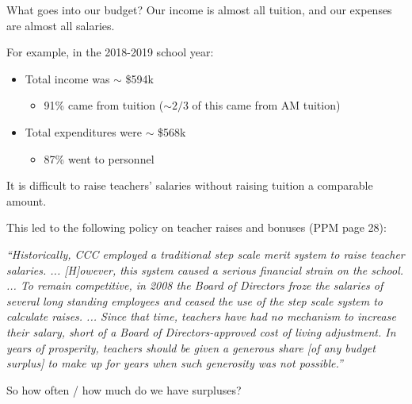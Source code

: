 \documentclass[8pt]{beamer}
\begin{document}
\begin{frame}{What goes into our budget?}
%
Our income is almost all tuition, and our expenses are almost all salaries.

For example, in the 2018-2019 school year:
%
\begin{itemize}
%
\item Total income was $\sim$ \$594k
\begin{itemize}
    \item 91\% came from tuition ($\sim 2/3$ of this came from AM tuition)
\end{itemize}
%
\item Total expenditures were $\sim$ \$568k
\begin{itemize}
    \item 87\% went to personnel
\end{itemize}
%
\end{itemize}
%

It is difficult to raise teachers' salaries without
raising tuition a comparable amount.

This led to the following policy on teacher raises and bonuses (PPM page 28):

{\em
%
``Historically, CCC employed a traditional step scale merit system to raise
teacher salaries. ... [H]owever, this system caused a serious financial strain on
the school. ... To remain competitive, in 2008 the Board of Directors froze the
salaries of several long standing employees and ceased the use of the step scale
system to calculate raises. ... Since that time, teachers have had no mechanism
to increase their salary, short of a Board of Directors-approved cost of living
adjustment.  In years of prosperity, teachers should be given a generous share
[of any budget surplus] to make up for years when such generosity was not
possible.''
%
}

So how often / how much do we have surpluses?

%
\end{frame}


\end{document}
